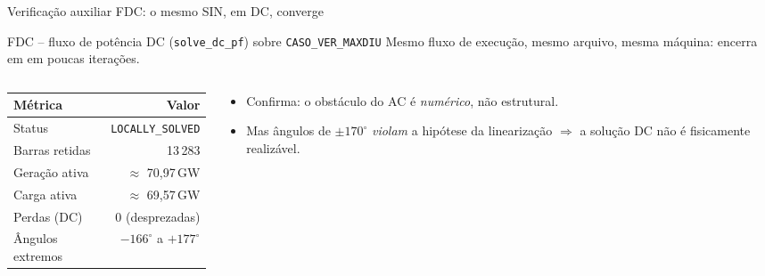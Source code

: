 \documentclass{libs/ufc_format}
\begin{document}
\begin{frame}{Verificação auxiliar FDC: o mesmo SIN, em DC, converge}
    \begin{exampleblock}{FDC -- fluxo de potência DC (\texttt{solve\_dc\_pf}) sobre \texttt{CASO\_VER\_MAXDIU}}
        Mesmo fluxo de execução, mesmo arquivo, mesma máquina: encerra em  em poucas iterações.
    \end{exampleblock}

    \begin{columns}
        \begin{column}{0.5\textwidth}
            \footnotesize
            \renewcommand{\arraystretch}{1.1}
            \begin{tabular}{lr}
                \hline
                \textbf{Métrica} & \textbf{Valor} \\
                \hline
                Status           & \texttt{LOCALLY\_SOLVED} \\
                Barras retidas   & 13\,283 \\
                Geração ativa    & $\approx$ 70{,}97\,GW \\
                Carga ativa      & $\approx$ 69{,}57\,GW \\
                Perdas (DC)      & 0 (desprezadas) \\
                Ângulos extremos & $-166^\circ$ a $+177^\circ$ \\
                \hline
            \end{tabular}
        \end{column}
        \begin{column}{0.5\textwidth}
            \begin{itemize}
                \item Confirma: o obstáculo do AC é \emph{numérico}, não estrutural.
                \item Mas ângulos de $\pm 170^\circ$ \emph{violam} a hipótese da linearização $\Rightarrow$ a solução DC não é fisicamente realizável.
            \end{itemize}
        \end{column}
    \end{columns}

    \vspace{0.2cm}
\end{frame}
\end{document}
